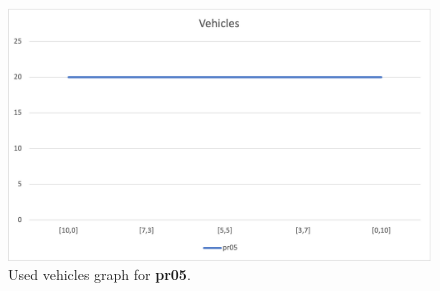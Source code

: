 \begin{figure}[H]
    \centering
    \includegraphics[height=0.25\textheight]{../graphs/pr05-vehicles.png}
    \caption{Used vehicles graph for \textbf{pr05}.}
\end{figure}

\newpage
